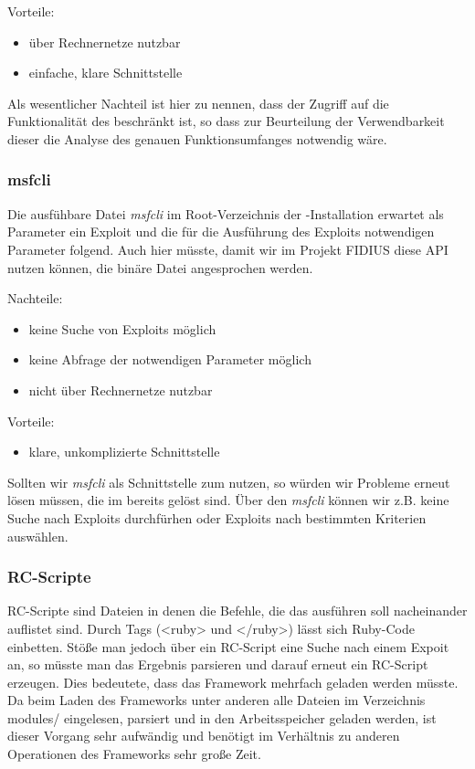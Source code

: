 Vorteile: 
\begin{itemize}
  \item über Rechnernetze nutzbar
  \item einfache, klare Schnittstelle
\end{itemize}

Als wesentlicher Nachteil ist hier zu nennen, dass der Zugriff auf die
Funktionalität des  beschränkt ist, so dass zur Beurteilung
der Verwendbarkeit dieser  die Analyse des genauen
Funktionsumfanges notwendig wäre.

\subsubsection{msfcli}

Die ausfühbare Datei \emph{msfcli} im Root-Verzeichnis der
-Installation erwartet als Parameter ein Exploit und die für
die Ausführung des Exploits notwendigen Parameter folgend.
Auch hier müsste, damit wir im Projekt FIDIUS diese API nutzen können,
die binäre Datei angesprochen werden. 

Nachteile:
\begin{itemize}
  \item keine Suche von Exploits möglich 
  \item keine Abfrage der notwendigen Parameter möglich
  \item nicht über Rechnernetze nutzbar
\end{itemize}

Vorteile: 
\begin{itemize}
  \item klare, unkomplizierte Schnittstelle
\end{itemize}

Sollten wir \emph{msfcli} als Schnittstelle zum  nutzen, so
würden wir Probleme erneut lösen müssen, die im  bereits
gelöst sind. Über den \emph{msfcli} können wir z.B. keine Suche nach
Exploits durchfürhen oder Exploits nach bestimmten Kriterien auswählen.

\subsubsection{RC-Scripte}

RC-Scripte sind Dateien in denen die Befehle, die das  ausführen
soll nacheinander auflistet sind. Durch Tags (<ruby> und </ruby>)
lässt sich Ruby-Code einbetten. 
Stöße man jedoch über ein RC-Script eine Suche nach einem Expoit an,
so müsste man das Ergebnis parsieren und darauf erneut ein RC-Script
erzeugen. Dies bedeutete, dass das Framework mehrfach geladen werden
müsste. Da beim Laden des Frameworks unter anderen alle Dateien im
Verzeichnis modules/ eingelesen, parsiert und in den Arbeitsspeicher
geladen werden, ist dieser Vorgang sehr aufwändig und benötigt im
Verhältnis zu anderen Operationen des Frameworks sehr große Zeit.

